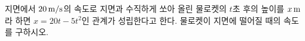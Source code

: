 지면에서 $20\mkern3mu \mathrm{m/s}$의 속도로 지면과 수직하게 쏘아 올린 물로켓의 $t$초 후의 높이를 $x\mkern3mu \mathrm{m}$라 하면 $x=20t-5t^2$인 관계가 성립한다고 한다. 물로켓이 지면에 떨어질 때의 속도를 구하시오.
